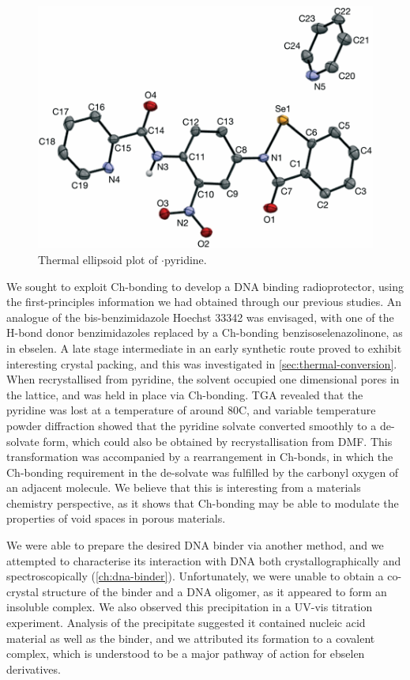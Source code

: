 \begin{refsection}
\begin{figure}
    \centering
    \includegraphics[width=0.8\linewidth]{Figures/ebs-nitroamide-2py-py-xtal.pdf}
    \caption{Thermal ellipsoid plot of $\cdot$pyridine.}
\end{figure}

We sought to exploit Ch-bonding to develop a DNA binding radioprotector, using the first-principles information we had obtained through our previous studies.
An analogue of the bis-benzimidazole Hoechst 33342 was envisaged, with one of the H-bond donor benzimidazoles replaced by a Ch-bonding benzisoselenazolinone, as in ebselen.
A late stage intermediate in an early synthetic route proved to exhibit interesting crystal packing, and this was investigated in \cref{sec:thermal-conversion}.
When recrystallised from pyridine, the solvent occupied one dimensional pores in the lattice, and was held in place via Ch-bonding.
TGA revealed that the pyridine was lost at a temperature of around 80\degree{}C, and variable temperature powder diffraction showed that the pyridine solvate converted smoothly to a de-solvate form, which could also be obtained by recrystallisation from DMF.\@
This transformation was accompanied by a rearrangement in Ch-bonds, in which the Ch-bonding requirement in the de-solvate was fulfilled by the carbonyl oxygen of an adjacent molecule.
We believe that this is interesting from a materials chemistry perspective, as it shows that Ch-bonding may be able to modulate the properties of void spaces in porous materials.

We were able to prepare the desired DNA binder via another method, and we attempted to characterise its interaction with DNA both crystallographically and spectroscopically (\cref{ch:dna-binder}).
Unfortunately, we were unable to obtain a co-crystal structure of the binder and a DNA oligomer, as it appeared to form an insoluble complex.
We also observed this precipitation in a UV-vis titration experiment.
Analysis of the precipitate suggested it contained nucleic acid material as well as the binder, and we attributed its formation to a covalent complex, which is understood to be a major pathway of action for ebselen derivatives.


\end{refsection}
